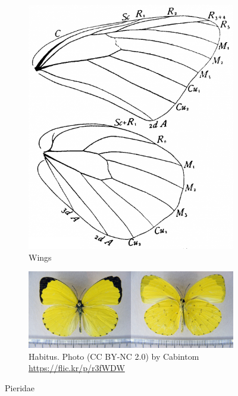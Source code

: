 \documentclass[letterpaper, 11pt]{article}
\begin{document}
\begin{figure}[ht!]
    \centering
    \begin{subfigure}[ht!]{0.25\textwidth}
        \includegraphics[width=\textwidth]{PieridWings}
        \caption{Wings \citep[Fig. 342]{comstock1918wings}}
        \label{fig:pierid1}
    \end{subfigure}
    \hfill %
    \begin{subfigure}[ht!]{0.67\textwidth}
        \includegraphics[width=\textwidth]{PieridHabitus}
        \caption{Habitus. Photo (CC BY-NC 2.0) by Cabintom \url{https://flic.kr/p/r3fWDW}}
        \label{fig:pierid2}
    \end{subfigure}
    \caption{Pieridae}\label{fig:pierids}
\end{figure}
\end{document}
